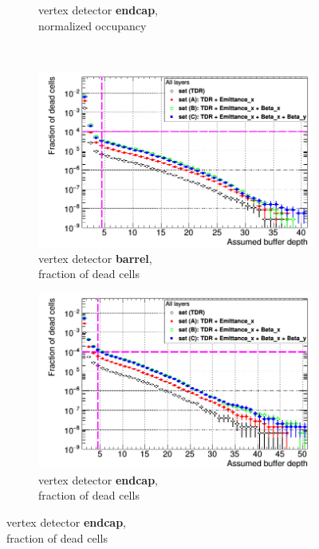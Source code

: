 \begin{figure}
\begin{subfigure}[b]{0.49\textwidth}
   \caption{\sid vertex detector \textbf{endcap},\\normalized occupancy}
   \end{subfigure}\\
   \begin{subfigure}[b]{0.49\textwidth}
   \centering
    \includegraphics[width=\textwidth]{Figures/Pairs/Occupancy_Comparison_All_layers_deadcells_ILC250_ALL_SETS_SiVertexBarrel_corrected_Barrel_size.png}
   \caption{\sid vertex detector \textbf{barrel},\\fraction of dead cells}
   \end{subfigure}
   \hfill
   \begin{subfigure}[b]{0.49\textwidth}
   \centering
    \includegraphics[width=\textwidth]{Figures/Pairs/Occupancy_Comparison_All_layers_deadcells_ILC250_ALL_SETS_5T_w_antiDiD_SiVertexEndcap.png}
   \caption{\sid vertex detector \textbf{endcap},\\fraction of dead cells}

\end{subfigure}
\end{figure}
